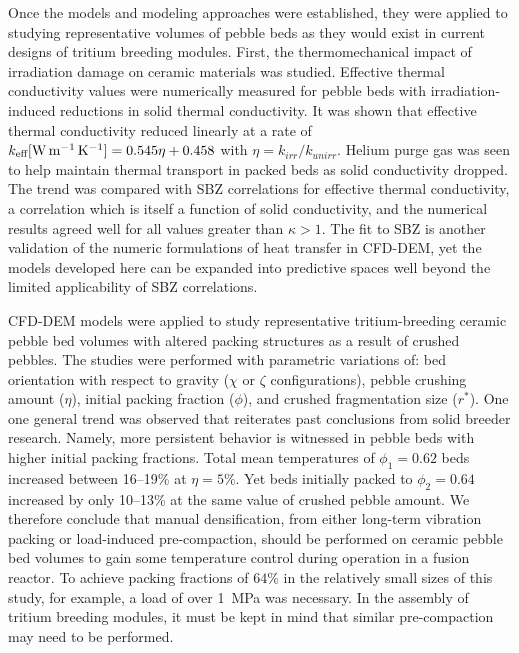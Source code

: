 Once the models and modeling approaches were established, they were applied to studying representative volumes of pebble beds as they would exist in current designs of tritium breeding modules. First, the thermomechanical impact of irradiation damage on ceramic materials was studied. Effective thermal conductivity values were numerically measured for pebble beds with irradiation-induced reductions in solid thermal conductivity. It was shown that effective thermal conductivity reduced linearly at a rate of $k_\text{eff} [\si{\watt\per\meter\per\kelvin}] = 0.545 \eta + 0.458$ with $\eta = k_{irr}/k_{unirr}$. Helium purge gas was seen to help maintain thermal transport in packed beds as solid conductivity dropped. The trend was compared with SBZ correlations for effective thermal conductivity, a correlation which is itself a function of solid conductivity, and the numerical results agreed well for all values greater than $\kappa > 1$. The fit to SBZ is another validation of the numeric formulations of heat transfer in CFD-DEM, yet the models developed here can be expanded into predictive spaces well beyond the limited applicability of SBZ correlations.

CFD-DEM models were applied to study representative tritium-breeding ceramic pebble bed volumes with altered packing structures as a result of crushed pebbles. The studies were performed with parametric variations of: bed orientation with respect to gravity ($\chi$ or $\zeta$ configurations), pebble crushing amount ($\eta$), initial packing fraction ($\phi$), and crushed fragmentation size ($r^*$). One one general trend was observed that reiterates past conclusions from solid breeder research. Namely, more persistent behavior is witnessed in pebble beds with higher initial packing fractions. Total mean temperatures of $\phi_1 = 0.62$ beds increased between \numrange{16}{19}\% at $\eta = 5\%$. Yet beds initially packed to $\phi_2 = 0.64$ increased by only \numrange{10}{13}\% at the same value of crushed pebble amount. We therefore conclude that manual densification, from either long-term vibration packing or load-induced pre-compaction, should be performed on ceramic pebble bed volumes to gain some temperature control during operation in a fusion reactor. To achieve packing fractions of $64\%$ in the relatively small sizes of this study, for example, a load of over \SI{1}{\mega\pascal} was necessary. In the assembly of tritium breeding modules, it must be kept in mind that similar pre-compaction may need to be performed.


